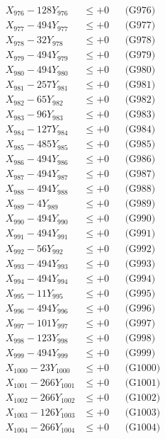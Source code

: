 \documentclass[a4paper,10pt]{article}
\begin{document}
{\begin{align}
X_{976} - 128Y_{976} &\leq +0 && \text{(G976)} \\
X_{977} - 494Y_{977} &\leq +0 && \text{(G977)} \\
X_{978} - 32Y_{978} &\leq +0 && \text{(G978)} \\
X_{979} - 494Y_{979} &\leq +0 && \text{(G979)} \\
X_{980} - 494Y_{980} &\leq +0 && \text{(G980)} \\
\allowbreak
X_{981} - 257Y_{981} &\leq +0 && \text{(G981)} \\
X_{982} - 65Y_{982} &\leq +0 && \text{(G982)} \\
X_{983} - 96Y_{983} &\leq +0 && \text{(G983)} \\
X_{984} - 127Y_{984} &\leq +0 && \text{(G984)} \\
X_{985} - 485Y_{985} &\leq +0 && \text{(G985)} \\
X_{986} - 494Y_{986} &\leq +0 && \text{(G986)} \\
X_{987} - 494Y_{987} &\leq +0 && \text{(G987)} \\
X_{988} - 494Y_{988} &\leq +0 && \text{(G988)} \\
X_{989} - 4Y_{989} &\leq +0 && \text{(G989)} \\
X_{990} - 494Y_{990} &\leq +0 && \text{(G990)} \\
\allowbreak
X_{991} - 494Y_{991} &\leq +0 && \text{(G991)} \\
X_{992} - 56Y_{992} &\leq +0 && \text{(G992)} \\
X_{993} - 494Y_{993} &\leq +0 && \text{(G993)} \\
X_{994} - 494Y_{994} &\leq +0 && \text{(G994)} \\
X_{995} - 11Y_{995} &\leq +0 && \text{(G995)} \\
X_{996} - 494Y_{996} &\leq +0 && \text{(G996)} \\
X_{997} - 101Y_{997} &\leq +0 && \text{(G997)} \\
X_{998} - 123Y_{998} &\leq +0 && \text{(G998)} \\
X_{999} - 494Y_{999} &\leq +0 && \text{(G999)} \\
X_{1000} - 23Y_{1000} &\leq +0 && \text{(G1000)} \\
\allowbreak
X_{1001} - 266Y_{1001} &\leq +0 && \text{(G1001)} \\
X_{1002} - 266Y_{1002} &\leq +0 && \text{(G1002)} \\
X_{1003} - 126Y_{1003} &\leq +0 && \text{(G1003)} \\
X_{1004} - 266Y_{1004} &\leq +0 && \text{(G1004)} \\

\end{align}}
\end{document}
